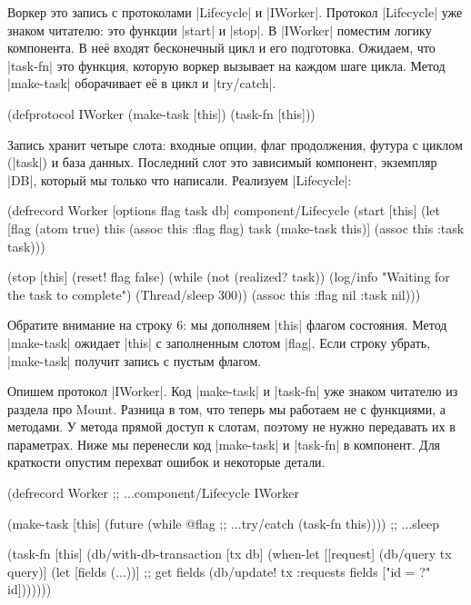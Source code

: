 Воркер это запись с протоколами \spverb|Lifecycle| и \spverb|IWorker|. Протокол
\spverb|Lifecycle| уже знаком читателю: это функции \spverb|start| и
\spverb|stop|. В \spverb|IWorker| поместим логику компонента. В не\"{е} входят
бесконечный цикл и его подготовка. Ожидаем, что \spverb|task-fn| это функция,
которую воркер вызывает на каждом шаге цикла. Метод \spverb|make-task|
оборачивает е\"{е} в цикл и \spverb|try/catch|.

\begin{english}
  \begin{clojure}
(defprotocol IWorker
  (make-task [this])
  (task-fn [this]))
  \end{clojure}
\end{english}

Запись хранит четыре слота: входные опции, флаг продолжения, футура с циклом
(\spverb|task|) и база данных. Последний слот это зависимый компонент, экземпляр
\spverb|DB|, который мы только что написали. Реализуем \spverb|Lifecycle|:

\begin{english}
  \begin{clojure/lines}
(defrecord Worker
  [options flag task db]
  component/Lifecycle
  (start [this]
    (let [flag (atom true)
          this (assoc this :flag flag)
          task (make-task this)]
      (assoc this :task task)))

  (stop [this]
    (reset! flag false)
    (while (not (realized? task))
      (log/info "Waiting for the task to complete")
      (Thread/sleep 300))
    (assoc this :flag nil :task nil)))
  \end{clojure/lines}
\end{english}

Обратите внимание на строку 6: мы дополняем \spverb|this| флагом
состояния. Метод \spverb|make-task| ожидает \spverb|this| с заполненным слотом
\spverb|flag|. Если строку убрать, \spverb|make-task| получит запись с пустым
флагом.

Опишем протокол \spverb|IWorker|. Код \spverb|make-task| и \spverb|task-fn| уже
знаком читателю из раздела про Mount. Разница в том, что теперь мы работаем не с
функциями, а методами. У метода прямой доступ к слотам, поэтому не нужно
передавать их в параметрах. Ниже мы перенесли код \spverb|make-task| и
\spverb|task-fn| в компонент. Для краткости опустим перехват ошибок и некоторые
детали.

\begin{english}
  \begin{clojure}
(defrecord Worker
  ;; ...component/Lifecycle
  IWorker

  (make-task [this]
    (future
      (while @flag        ;; ...try/catch
        (task-fn this)))) ;; ...sleep

  (task-fn [this]
    (db/with-db-transaction [tx db]
      (when-let [[request] (db/query tx query)]
        (let [fields (...))] ;; get fields
          (db/update! tx :requests
                      fields ["id = ?" id]))))))
  \end{clojure}
\end{english}

